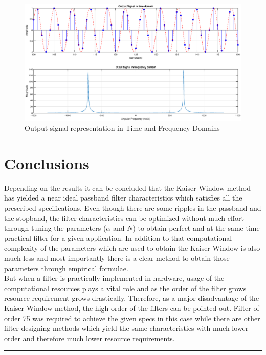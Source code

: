 \documentclass[a4paper,11pt]{article}%
\begin{document}
\begin{figure}[!h]
	\centering
	\includegraphics[scale=0.45]{figures/output-signal}
	\caption{Output signal representation in Time and Frequency Domains}
\end{figure}
\pagebreak

\section{Conclusions}

Depending on the results it can be concluded that the Kaiser Window method has yielded a near ideal passband filter characteristics which satisfies all the prescribed specifications. Even though there are some ripples in the passband and the stopband, the filter characteristics can be optimized without much effort through tuning the parameters ($\alpha$ and $N$) to obtain perfect and at the same time practical filter for a given application. In addition to that computational complexity of the parameters which are used to obtain the Kaiser Window is also much less and most importantly there is a clear method to obtain those parameters through empirical formulae.\\

But when a filter is practically implemented in hardware, usage of the computational resources plays a vital role and as the order of the filter grows resource requirement grows drastically. Therefore,  as a major disadvantage of the Kaiser Window method, the high order of the filters can be pointed out. Filter of order 75 was required to achieve the given specs in this case while there are other filter designing methods which yield the same characteristics with much lower order and therefore much lower resource requirements.

\vfill
\hrule
\vspace{0.5cm}



\pagebreak

%
\end{document}
